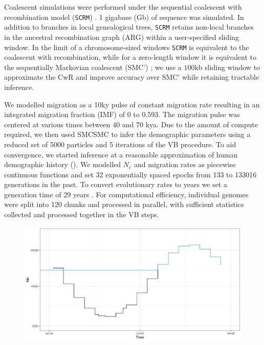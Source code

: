 Coalescent simulations were performed under the sequential coalescent with recombination model ({\tt SCRM}) \cite{Staab2015}. 1 gigabase (Gb) of sequence was simulated.  In addition to branches in local genealogical trees, {\tt SCRM} retains non-local branches in the ancestral recombination graph (ARG) within a user-specified sliding window.  In the limit of a chromosome-sized windows {\tt SCRM} is equivalent to the coalescent with recombination, while for a zero-length window it is equivalent to the sequentially Markovian coalescent (SMC') \cite{McVean2005,Marjoram2006}; we use a $100$kb sliding window to approximate the CwR and improve accuracy over SMC' while retaining tractable inference.

We modelled migration as a 10ky pulse of constant migration rate resulting in an integrated migration fraction (IMF) of 0 to 0.593. The migration pulse was centered at various times between 40 and 70 kya.  Due to the amount of compute required, we then used SMCSMC to infer the demographic parameters using a reduced set of 5000 particles and 5 iterations of the VB procedure. To aid convergence, we started inference at a reasonable approximation of human demographic history (). We modelled $N_e$ and migration rates as piecewise continuous functions and set 32 exponentially spaced epochs from 133 to 133016 generations in the past. To convert evolutionary rates to years we set a generation time of 29 years \cite{Fenner2005}.  For computational efficiency, individual genomes were split into 120 chunks and processed in parallel, with sufficient statistics collected and processed together in the VB steps.


\begin{figure}[hb]
  \centering
  \includegraphics[width = 0.5\linewidth]{plot/demographic_model.png}
  \label{fig:dem}
\end{figure}


